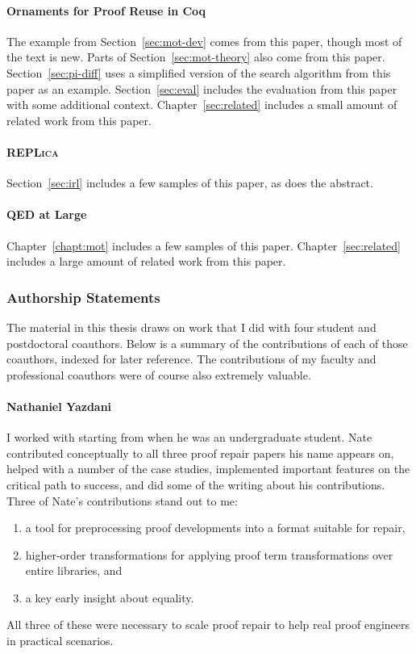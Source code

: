 \paragraph{Ornaments for Proof Reuse in Coq}
The example from Section~\ref{sec:mot-dev} comes from this paper, though most of the text is new.
Parts of Section~\ref{sec:mot-theory} also come from this paper.
Section~\ref{sec:pi-diff} uses a simplified version of the search algorithm from this paper as an example.
Section~\ref{sec:eval} includes the evaluation from this paper with some additional context.
Chapter~\ref{sec:related} includes a small amount of related work from this paper.

\paragraph{\textsc{REPLica}}
Section~\ref{sec:irl} includes a few samples of this paper, as does the abstract.

\paragraph{QED at Large}
Chapter~\ref{chapt:mot} includes a few samples of this paper.
Chapter~\ref{sec:related} includes a large amount of related work from this paper.

\subsubsection*{Authorship Statements}

The material in this thesis draws on work that I did with four student and postdoctoral coauthors.
Below is a summary of the contributions of each of those coauthors,
indexed for later reference.
The contributions of my faculty and professional coauthors were of course also extremely valuable.

\paragraph{Nathaniel Yazdani}
I worked with  starting from when he was an undergraduate student.
Nate contributed conceptually to all three proof repair papers his name appears on,
helped with a number of the case studies,
implemented important features on the critical path to success,
and did some of the writing about his contributions.
Three of Nate's contributions stand out to me:

\begin{enumerate}
\item a tool for preprocessing proof developments into a format suitable for repair,
\item higher-order transformations for applying proof term transformations over entire libraries, and
\item a key early insight about equality.
\end{enumerate}
All three of these were necessary to scale proof repair to help real proof engineers in practical scenarios.

